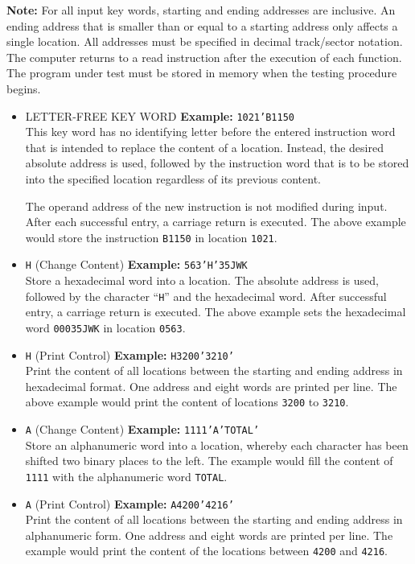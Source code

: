 \textbf{Note:} For all input key words, starting and ending addresses are inclusive. An ending address that is smaller than or equal to a starting address only affects a single location. All addresses must be specified in decimal track/sector notation. The computer returns to a read instruction after the execution of each function. The program under test must be stored in memory when the testing procedure begins.
\begin{itemize}
\item LETTER-FREE KEY WORD
\textbf{Example:} \texttt{1021'B1150} \\
This key word has no identifying letter before the entered instruction word that is intended to replace the content of a location. Instead, the desired absolute address is used, followed by the instruction word that is to be stored into the specified location regardless of its previous content. 

The operand address of the new instruction is not modified during input. After each successful entry, a carriage return is executed. The above example would store the instruction \texttt{B1150} in location \texttt{1021}.

\item \texttt{H} (Change Content)
\textbf{Example:} \texttt{563'H'35JWK} \\
Store a hexadecimal word into a location. The absolute address is used, followed by the character ``\texttt{H}'' and the hexadecimal word. After successful entry, a carriage return is executed. The above example sets the hexadecimal word \texttt{00035JWK} in location \texttt{0563}.

\item \texttt{H} (Print Control)
\textbf{Example:} \texttt{H3200'3210'} \\
Print the content of all locations between the starting and ending address in hexadecimal format. One address and eight words are printed per line. The above example would print the content of locations \texttt{3200} to \texttt{3210}.

\item \texttt{A} (Change Content)
\textbf{Example:} \texttt{1111'A'TOTAL'} \\
Store an alphanumeric word into a location, whereby each character has been shifted two binary places to the left. The example would fill the content of \texttt{1111} with the alphanumeric word \texttt{TOTAL}.

\item \texttt{A} (Print Control)
\textbf{Example:} \texttt{A4200'4216'} \\
Print the content of all locations between the starting and ending address in alphanumeric form. One address and eight words are printed per line. The example would print the content of the locations between \texttt{4200} and \texttt{4216}.


\end{itemize}
